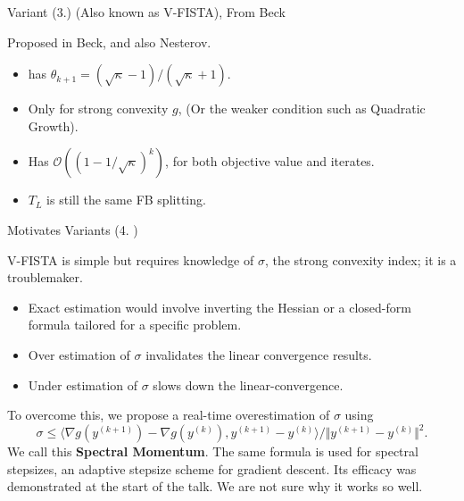 \documentclass[11pt]{beamer}
\theoremstyle{definition}
\begin{document}
    \begin{frame}{Variant (3.) (Also known as V-FISTA), From Beck}
        \begin{algorithm}[H]
            \begin{tiny}
                \begin{algorithmic}[1]
                    \ENDFOR
                \end{algorithmic}
                \caption{Generic FISTA}    
            \end{tiny}
        \end{algorithm}
        Proposed in Beck\cite{beck_first-order_nodate}, and also Nesterov\cite{nesterov_lecture_2018}. 
        \begin{itemize}
            \item has $\theta_{k + 1} = (\sqrt{\kappa} - 1)/(\sqrt{\kappa} + 1)$. 
            \item Only for strong convexity $g$, (Or the weaker condition such as Quadratic Growth). 
            \item Has $\mathcal O((1 - 1/\sqrt{\kappa})^k)$, for both objective value and iterates. 
            \item $T_L$ is still the same FB splitting. 
        \end{itemize}
    \end{frame}
    \begin{frame}{Motivates Variants (4. )}
        
        V-FISTA is simple but requires knowledge of $\sigma$, the strong convexity index; it is a troublemaker. 
        \begin{itemize}
            \item Exact estimation would involve inverting the Hessian or a closed-form formula tailored for a specific problem. 
            \item Over estimation of $\sigma$ invalidates the linear convergence results. 
            \item Under estimation of $\sigma$ slows down the linear-convergence. 
        \end{itemize}
        To overcome this, we propose a real-time overestimation of $\sigma$ using 
        \[
            \sigma \le \langle \nabla g(y^{(k + 1)}) - \nabla g(y^{(k)}), y^{(k + 1)} - y^{(k)}\rangle/ 
                    \Vert y^{(k + 1)} - y^{(k)}\Vert^2. 
        \]
        We call this \textbf{Spectral Momentum}. 
        The same formula is used for spectral stepsizes, an adaptive stepsize scheme for gradient descent\cite[4.1]{goldstein_field_2016}. 
        Its efficacy was demonstrated at the start of the talk. 
        We are not sure why it works so well. 
    \end{frame}
\end{document}
